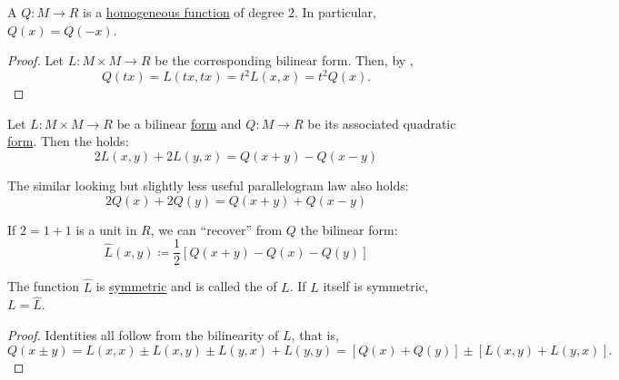 \begin{proposition}\label{thm:bilinear_forms_vs_to_quadratic_forms}
  A  \( Q: M \to R \) is a \hyperref[def:homogenous_function]{homogeneous function} of degree \( 2 \). In particular, \( Q(x) = Q(-x) \).
\end{proposition}
\begin{proof}
  Let \( L: M \times M \to R \) be the corresponding bilinear form. Then, by ,
  \begin{equation*}
    Q(tx) = L(tx, tx) = t^2 L(x, x) = t^2 Q(x).
  \end{equation*}
\end{proof}

\begin{proposition}\label{thm:polarization_identity}
  Let \( L: M \times M \to R \) be a bilinear \hyperref[def:bilinear_form]{form} and \( Q: M \to R \) be its associated quadratic \hyperref[def:quadratic_form]{form}. Then the  holds:
  \begin{equation}\label{thm:polarization_identity/polarization_identity}
    2 L(x, y) + 2 L(y, x) = Q(x + y) - Q(x - y)
  \end{equation}

  The similar looking but slightly less useful parallelogram law also holds:
  \begin{equation}\label{thm:polarization_identity/parallelogram_law}
    2 Q(x) + 2 Q(y) = Q(x + y) + Q(x - y)
  \end{equation}

  If \( 2 = 1 + 1 \) is a unit in \( R \), we can \enquote{recover} from \( Q \) the bilinear form:
  \begin{equation}\label{thm:polarization_identity/symmetrization_definition}
    \hat L(x, y) \coloneqq \frac 1 2 \left[ Q(x + y) - Q(x) - Q(y) \right]
  \end{equation}

  The function \( \hat L \) is \hyperref[def:symmetric_function]{symmetric} and is called the  of \( L \). If \( L \) itself is symmetric, \( L = \hat L \).
\end{proposition}
\begin{proof}
  Identities  all follow from the bilinearity of \( L \), that is,
  \begin{equation*}
    Q(x \pm y)
    =
    L(x, x) \pm L(x, y) \pm L(y, x) + L(y, y)
    =
    [Q(x) + Q(y)] \pm [L(x, y) + L(y, x)].
  \end{equation*}
\end{proof}

